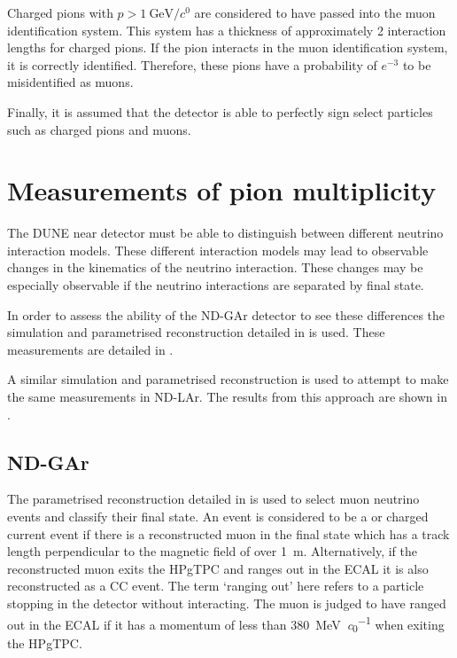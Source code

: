Charged pions with $p>\SI{1}{\GeV\per\clight}$ are considered to have passed into the muon identification system. 
This system has a thickness of approximately 2 interaction lengths for charged pions.
If the pion interacts in the muon identification system, it is correctly identified.
Therefore, these pions have a probability of $e^{-3}$ to be misidentified as muons.

Finally, it is assumed that the detector is able to perfectly sign select particles such as charged pions and muons.

\section{Measurements of pion multiplicity}
\label{sec:dune_ndrwt:pionMulti}

The DUNE near detector must be able to distinguish between different neutrino interaction models.
These different interaction models may lead to observable changes in the kinematics of the neutrino interaction.
These changes may be especially observable if the neutrino interactions are separated by final state. 

In order to assess the ability of the ND-GAr detector to see these differences the simulation and parametrised reconstruction detailed in  is used.
These measurements are detailed in .

A similar simulation and parametrised reconstruction is used to attempt to make the same measurements in ND-LAr. 
The results from this approach are shown in .

\subsection{ND-GAr}
\label{sec:dune_ndrwt:pionMulti:gar}

The parametrised reconstruction detailed in  is used to select muon neutrino events and classify their final state.
An event is considered to be a \numu or \anumu charged current event if there is a reconstructed muon in the final state which has a track length perpendicular to the magnetic field of over \SI{1}{\metre}.
Alternatively, if the reconstructed muon exits the HPgTPC and ranges out in the ECAL it is also reconstructed as a \numu CC event.
The term `ranging out' here refers to a particle stopping in the detector without interacting.
The muon is judged to have ranged out in the ECAL if it has a momentum of less than \SI{380}{\MeV\per\clight} when exiting the HPgTPC. 

